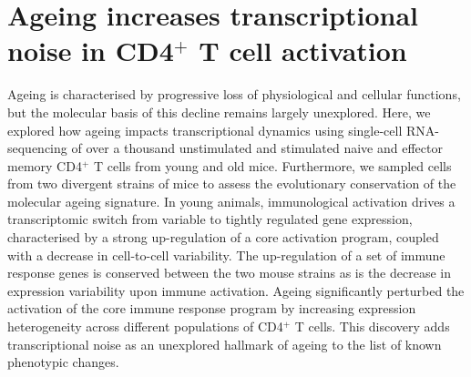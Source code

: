 
\chapter{Ageing increases transcriptional noise in CD4$^+$ T cell activation}

\graphicspath{{"../../Dropbox (Cambridge  University)/Figures_for_thesis/Chapter1/"}}

\vfill

\begin{Abstract}
Ageing is characterised by progressive loss of physiological and cellular functions, but the molecular basis of this decline remains largely unexplored. Here, we explored how ageing impacts transcriptional dynamics using single-cell RNA-sequencing of over a thousand unstimulated and stimulated naive and effector memory CD4$^+$ T cells from young and old mice. Furthermore, we sampled cells from two divergent strains of mice to assess the evolutionary conservation of the molecular ageing signature. In young animals, immunological activation drives a transcriptomic switch from variable to tightly regulated gene expression, characterised by a strong up-regulation of a core activation program, coupled with a decrease in cell-to-cell variability. The up-regulation of a set of immune response genes is conserved between the two mouse strains as is the decrease in expression variability upon immune activation. Ageing significantly perturbed the activation of the core immune response program by increasing expression heterogeneity across different populations of CD4$^+$ T cells. This discovery adds transcriptional noise as an unexplored hallmark of ageing to the list of known phenotypic changes.
\end{Abstract}

\vfill

\newpage

